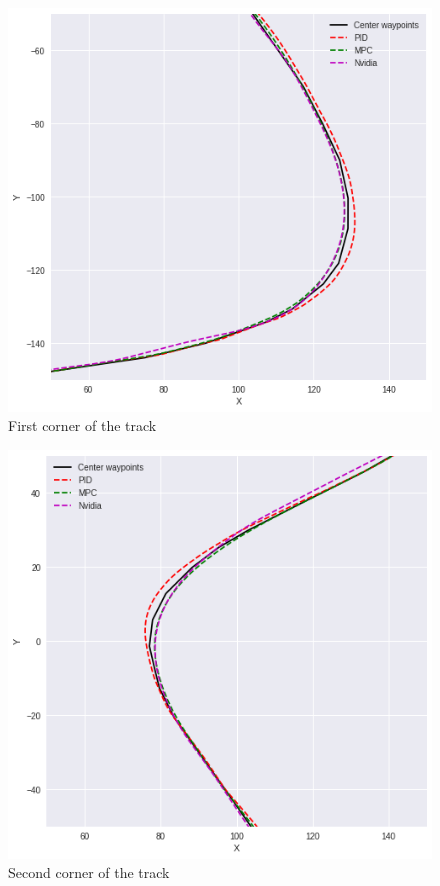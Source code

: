 \begin{figure}[htbp]
\centerline{
\includegraphics[width=0.8\linewidth]{plots/coord_1.png}}
\caption{First corner of the track}
\label{coord_1}
\end{figure}
\begin{figure}[htbp]
\centerline{
\includegraphics[width=0.8\linewidth]{plots/coord_2.png}}
\caption{Second corner of the track}
\label{coord_2}
\end{figure}

